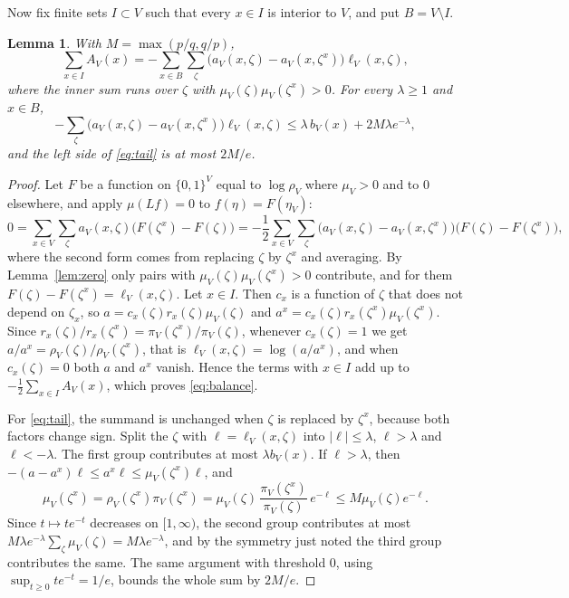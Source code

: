 \documentclass[11pt]{amsart}
\newtheorem{lemma}[theorem]{Lemma}
\theoremstyle{remark}
\begin{document}
Now fix finite sets $I\subset V$ such that every $x\in I$ is interior to $V$, and put $B=V\setminus I$.

\begin{lemma}\label{lem:balance}
With $M=\max(p/q,q/p)$,
\begin{equation}\label{eq:balance}
\sum_{x\in I}A_V(x)=-\sum_{x\in B}\sum_\zeta\bigl(a_V(x,\zeta)-a_V(x,\zeta^x)\bigr)\ell_V(x,\zeta),
\end{equation}
where the inner sum runs over $\zeta$ with $\mu_V(\zeta)\mu_V(\zeta^x)>0$. For every $\lambda\ge1$ and $x\in B$,
\begin{equation}\label{eq:tail}
-\sum_\zeta\bigl(a_V(x,\zeta)-a_V(x,\zeta^x)\bigr)\ell_V(x,\zeta)\le\lambda\,b_V(x)+2M\lambda e^{-\lambda},
\end{equation}
and the left side of \eqref{eq:tail} is at most $2M/e$.
\end{lemma}

\begin{proof}
Let $F$ be a function on $\{0,1\}^V$ equal to $\log\rho_V$ where $\mu_V>0$ and to $0$ elsewhere, and apply
$\mu(Lf)=0$ to $f(\eta)=F(\eta_V)$:
\[
0=\sum_{x\in V}\sum_\zeta a_V(x,\zeta)\bigl(F(\zeta^x)-F(\zeta)\bigr)
=-\frac12\sum_{x\in V}\sum_\zeta\bigl(a_V(x,\zeta)-a_V(x,\zeta^x)\bigr)\bigl(F(\zeta)-F(\zeta^x)\bigr),
\]
where the second form comes from replacing $\zeta$ by $\zeta^x$ and averaging. By Lemma~\ref{lem:zero} only pairs with
$\mu_V(\zeta)\mu_V(\zeta^x)>0$ contribute, and for them $F(\zeta)-F(\zeta^x)=\ell_V(x,\zeta)$. Let $x\in I$. Then
$c_x$ is a function of $\zeta$ that does not depend on $\zeta_x$, so $a=c_x(\zeta)r_x(\zeta)\mu_V(\zeta)$ and
$a^x=c_x(\zeta)r_x(\zeta^x)\mu_V(\zeta^x)$. Since $r_x(\zeta)/r_x(\zeta^x)=\pi_V(\zeta^x)/\pi_V(\zeta)$, whenever
$c_x(\zeta)=1$ we get $a/a^x=\rho_V(\zeta)/\rho_V(\zeta^x)$, that is $\ell_V(x,\zeta)=\log(a/a^x)$, and when
$c_x(\zeta)=0$ both $a$ and $a^x$ vanish. Hence the terms with $x\in I$ add up to $-\frac12\sum_{x\in I}A_V(x)$, which
proves \eqref{eq:balance}.

For \eqref{eq:tail}, the summand is unchanged when $\zeta$ is replaced by $\zeta^x$, because both factors change
sign. Split the $\zeta$ with $\ell=\ell_V(x,\zeta)$ into $|\ell|\le\lambda$, $\ell>\lambda$ and $\ell<-\lambda$. The
first group contributes at most $\lambda b_V(x)$. If $\ell>\lambda$, then $-(a-a^x)\ell\le a^x\ell\le\mu_V(\zeta^x)\ell$,
and
\[
\mu_V(\zeta^x)=\rho_V(\zeta^x)\pi_V(\zeta^x)=\mu_V(\zeta)\,\frac{\pi_V(\zeta^x)}{\pi_V(\zeta)}\,e^{-\ell}
\le M\mu_V(\zeta)e^{-\ell}.
\]
Since $t\mapsto te^{-t}$ decreases on $[1,\infty)$, the second group contributes at most
$M\lambda e^{-\lambda}\sum_\zeta\mu_V(\zeta)=M\lambda e^{-\lambda}$, and by the symmetry just noted the third
group contributes the same. The same argument with threshold $0$, using $\sup_{t\ge0}te^{-t}=1/e$, bounds the whole
sum by $2M/e$.
\end{proof}
\end{document}
